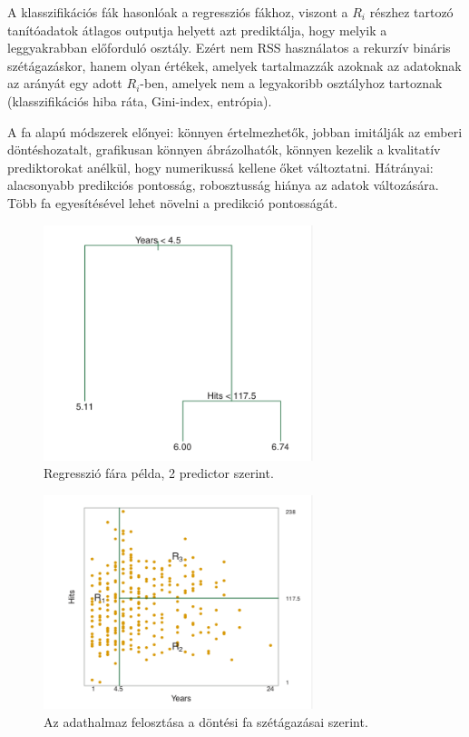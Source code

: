 \documentclass[12pt]{article}
\theoremstyle{plain}
\begin{document}
A klasszifikációs fák hasonlóak a regressziós fákhoz, viszont a $R_i$ részhez tartozó tanítóadatok átlagos outputja helyett azt prediktálja, hogy melyik a leggyakrabban előforduló osztály. Ezért nem RSS használatos a rekurzív bináris szétágazáskor, hanem olyan értékek, amelyek tartalmazzák azoknak az adatoknak az arányát egy adott $R_i$-ben, amelyek nem a legyakoribb osztályhoz tartoznak (klasszifikációs hiba ráta, Gini-index, entrópia). 

A fa alapú módszerek előnyei: könnyen értelmezhetők, jobban imitálják az emberi döntéshozatalt, grafikusan könnyen ábrázolhatók, könnyen kezelik a kvalitatív prediktorokat anélkül, hogy numerikussá kellene őket változtatni. Hátrányai: alacsonyabb predikciós pontosság, robosztusság hiánya az adatok változására. Több fa egyesítésével lehet növelni a predikció pontosságát. 


\begin{figure}
    \begin{center}
    \includegraphics[width=0.7\textwidth]{media/tree1.png}
    \caption{Regresszió fára példa, 2 predictor szerint.} 
    \label{fig:tree1}
    \end{center}
\end{figure}

\begin{figure}
    \begin{center}
    \includegraphics[width=0.7\textwidth]{media/tree2.png}
    \caption{Az adathalmaz felosztása a döntési fa szétágazásai szerint. } 
    \label{fig:tree2}
    \end{center}
\end{figure}
\end{document}
